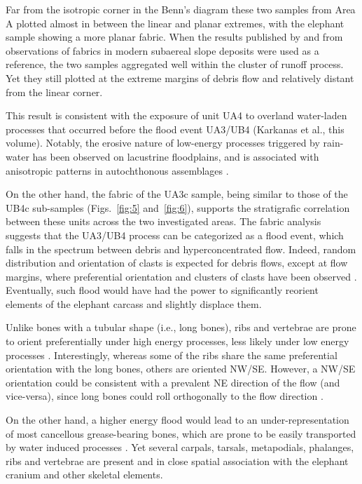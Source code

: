 \documentclass[review,authoryear,times]{elsarticle} %
\begin{document}
Far from the isotropic corner in the Benn's diagram these two samples from Area A plotted almost in between the linear and planar extremes, with the elephant sample showing a more planar fabric. When the results published by \cite{Bertran1997} and \cite{Lenoble2004} from observations of fabrics in modern subaereal slope deposits were used as a reference, the two samples aggregated well within the cluster of runoff process. Yet they still plotted at the extreme margins of debris flow and relatively distant from the linear corner.

This result is consistent with the exposure of unit UA4 to overland water-laden processes that occurred before the flood event UA3/UB4 (Karkanas et al., this volume). Notably, the erosive nature of low-energy processes triggered by rain-water has been observed on lacustrine floodplains, and is associated with anisotropic patterns in autochthonous assemblages \citep{Cobo-Sanchez2014,Dominguez-Rodrigo2014,Garcia-Moreno2016}.

On the other hand, the fabric of the UA3c sample, being similar to those of the UB4c sub-samples (Figs.~\ref{fig:5} and~\ref{fig:6}), supports the stratigrafic correlation between these units across the two investigated areas. The fabric analysis suggests that the UA3/UB4 process can be categorized as a flood event, which falls in the spectrum between debris and hyperconcentrated flow. Indeed, random distribution and orientation of clasts is expected for debris flows, except at flow margins, where preferential orientation and clusters of clasts have been observed \citep{Pierson2005}. Eventually, such flood would have had the power to significantly reorient elements of the elephant carcass and slightly displace them.

Unlike bones with a tubular shape (i.e., long bones), ribs and vertebrae are prone to orient preferentially under high energy processes, less likely under low energy processes \citep{Dominguez-Rodrigo2013,Dominguez-Rodrigo2014}. Interestingly, whereas some of the ribs share the same preferential orientation with the long bones, others are oriented NW/SE. However, a NW/SE orientation could be consistent with a prevalent NE direction of the flow (and vice-versa), since long bones could roll orthogonally to the flow direction \citep{Voorhies1966}.

On the other hand, a higher energy flood would lead to an under-representation of most cancellous grease-bearing bones, which are prone to be easily transported by water induced processes \citep{Voorhies1966}. Yet several carpals, tarsals, metapodials, phalanges, ribs and vertebrae are present and in close spatial association with the elephant cranium and other skeletal elements.
\end{document}
